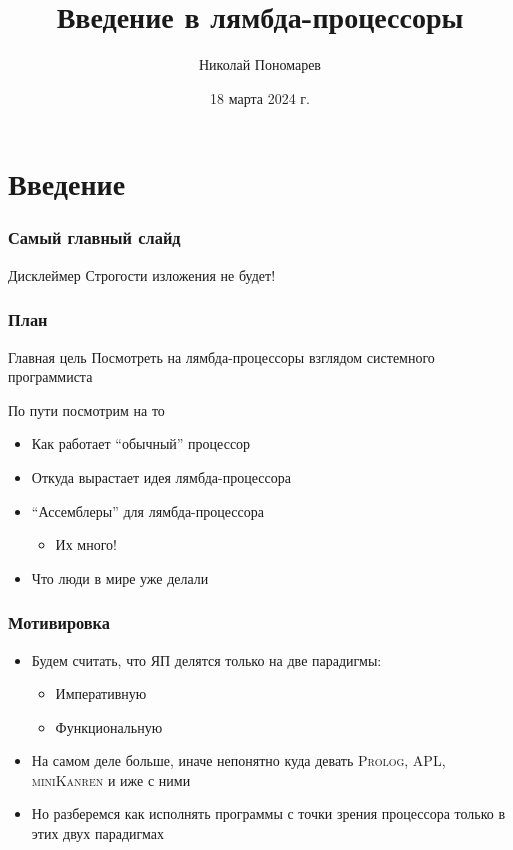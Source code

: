 \documentclass[aspectratio=169]{beamer}
\title{Введение в лямбда-процессоры}
\author{Николай Пономарев}
\institute[Матмех СПбГУ]{Математико-механический факультет СПбГУ}
\date{18 марта 2024 г.}
\begin{document}
\begin{frame}
    \maketitle
\end{frame}

\section{Введение}

\begin{frame}
    \frametitle{Самый главный слайд}

    \begin{alertblock}{Дисклеймер}
        Строгости изложения не будет!
    \end{alertblock}

\end{frame}

\begin{frame}
    \frametitle{План}

    \begin{block}{Главная цель}
        Посмотреть на лямбда-процессоры взглядом системного программиста
    \end{block}

    По пути посмотрим на то
    \begin{itemize}
        \item Как работает \enquote{обычный} процессор
        \item Откуда вырастает идея лямбда-процессора
        \item \enquote{Ассемблеры} для лямбда-процессора
              \begin{itemize}
                  \item Их много!
              \end{itemize}
        \item Что люди в мире уже делали
    \end{itemize}

\end{frame}

\begin{frame}
    \frametitle{Мотивировка}
    \begin{itemize}
        \item Будем считать, что ЯП делятся только на две парадигмы:
              \begin{itemize}
                  \item Императивную
                  \item Функциональную
              \end{itemize}
        \item На самом деле больше, иначе непонятно куда девать \textsc{Prolog, APL, miniKanren} и иже с ними
        \item Но разберемся как исполнять программы с точки зрения процессора только в этих двух парадигмах
    \end{itemize}
\end{frame}
\end{document}
